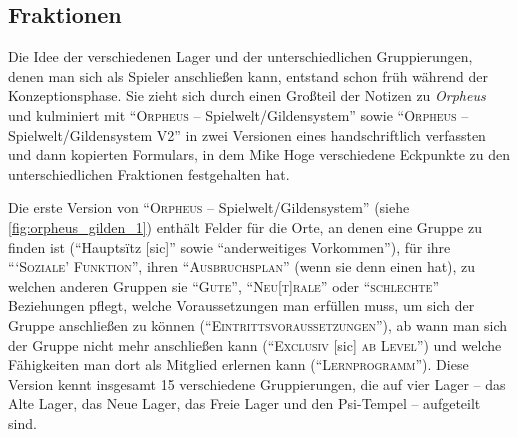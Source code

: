 \documentclass[a5paper,pagesize,numbers=noenddot]{scrbook}
\begin{document}
\subsection{Fraktionen}\label{sec:orpheus_welt_fraktionen}
Die Idee der verschiedenen Lager und der unterschiedlichen Gruppierungen, denen man sich als Spieler anschließen kann, entstand schon früh während der Konzeptionsphase.
Sie zieht sich durch einen Großteil der Notizen zu \textit{Orpheus} und kulminiert mit \enquote{\textsc{Orpheus} -- Spielwelt/Gildensystem} sowie \enquote{\textsc{Orpheus} -- Spielwelt/Gildensystem V2} in zwei Versionen eines handschriftlich verfassten und dann kopierten Formulars, in dem Mike Hoge verschiedene Eckpunkte zu den unterschiedlichen Fraktionen festgehalten hat.

Die erste Version von \enquote{\textsc{Orpheus} -- Spielwelt/Gildensystem} (siehe \autoref{fig:orpheus_gilden_1}) enthält Felder für die Orte, an denen eine Gruppe zu finden ist (\enquote{Hauptsïtz [sic]} sowie \enquote{anderweitiges Vorkommen}), für ihre \enquote{\enquote{\textsc{Soziale}} \textsc{Funktion}}, ihren \enquote{\textsc{Ausbruchsplan}} (wenn sie denn einen hat), zu welchen anderen Gruppen sie \enquote{\textsc{Gute}}, \enquote{\textsc{Neu[t]rale}} oder \enquote{\textsc{schlechte}} Beziehungen pflegt, welche Voraussetzungen man erfüllen muss, um sich der Gruppe anschließen zu können (\enquote{\textsc{Eintrittsvoraussetzungen}}), ab wann man sich der Gruppe nicht mehr anschließen kann (\enquote{\textsc{Exclusiv} [sic] \textsc{ab Level}}) und welche Fähigkeiten man dort als Mitglied erlernen kann (\enquote{\textsc{Lernprogramm}}).\autocite[S.~16]{orpheus_gildensystem}
Diese Version kennt insgesamt 15 verschiedene Gruppierungen, die auf vier Lager -- das Alte Lager, das Neue Lager, das Freie Lager und den Psi-Tempel -- aufgeteilt sind.


\end{document}
